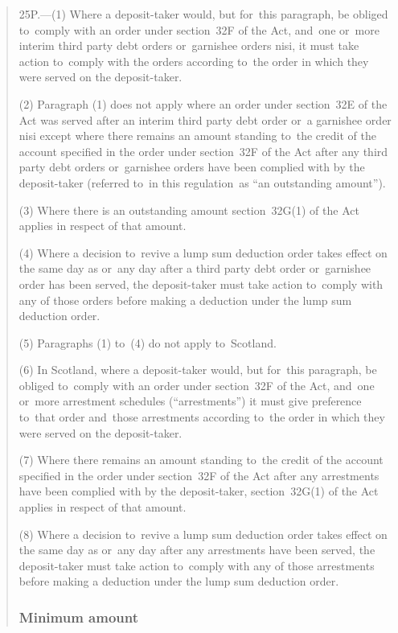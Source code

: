 \documentclass[12pt,a4paper]{article}
\begin{document}
\begin{quotation}
25P.---(1)  Where a deposit-taker would, but for~this paragraph, be obliged to~comply with an order under section~32F of the Act, and~one or~more interim third party debt orders or~garnishee orders nisi, it must take action to~comply with the orders according to~the order in which they were served on the deposit-taker.

(2) Paragraph (1) does not apply where an order under section~32E of the Act was served after an interim third party debt order or~a garnishee order nisi except where there remains an amount standing to~the credit of the account specified in the order under section~32F of the Act after any third party debt orders or~garnishee orders have been complied with by the deposit-taker (referred to~in this regulation~as “an outstanding amount”).

(3) Where there is an outstanding amount section~32G(1) of the Act applies in respect of that amount.

(4) Where a decision to~revive a lump sum deduction order takes effect on the same day as or~any day after a third party debt order or~garnishee order has been served, the deposit-taker must take action to~comply with any of those orders before making a deduction under the lump sum deduction order.

(5) Paragraphs (1) to~(4) do not apply to~Scotland.

(6) In Scotland, where a deposit-taker would, but for~this paragraph, be obliged to~comply with an order under section~32F of the Act, and~one or~more arrestment schedules (“arrestments”) it must give preference to~that order and~those arrestments according to~the order in which they were served on the deposit-taker.

(7) Where there remains an amount standing to~the credit of the account specified in the order under section~32F of the Act after any arrestments have been complied with by the deposit-taker, section~32G(1) of the Act applies in respect of that amount.

(8) Where a decision to~revive a lump sum deduction order takes effect on the same day as or~any day after any arrestments have been served, the deposit-taker must take action to~comply with any of those arrestments before making a deduction under the lump sum deduction order.

\subsubsection*{Minimum amount}


\end{quotation}
\end{document}
